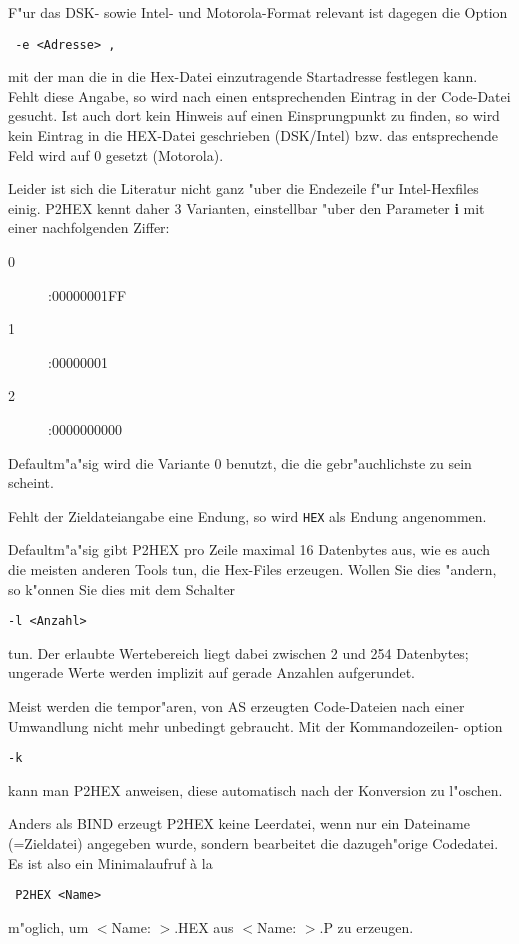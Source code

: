 \documentclass[12pt,a4paper,twoside]{report}
\newcommand{\bb}[1]{{\bf #1}}
\newcommand{\tty}[1]{{\tt #1}}
\begin{document}
F"ur das DSK- sowie Intel- und Motorola-Format relevant ist dagegen
die Option
\begin{verbatim}
 -e <Adresse> ,
\end{verbatim}
mit der man die in die Hex-Datei einzutragende Startadresse festlegen
kann.  Fehlt diese Angabe, so wird nach einen entsprechenden Eintrag
in der Code-Datei gesucht.  Ist auch dort kein Hinweis auf einen
Einsprungpunkt zu finden, so wird kein Eintrag in die HEX-Datei
geschrieben (DSK/Intel) bzw. das entsprechende Feld wird auf 0 gesetzt
(Motorola).
\par
Leider ist sich die Literatur nicht ganz "uber die Endezeile f"ur
Intel-Hexfiles einig.  P2HEX kennt daher 3 Varianten, einstellbar "uber
den Parameter \bb{i} mit einer nachfolgenden Ziffer:
\begin{description}
\item[0]{ :00000001FF}
\item[1]{ :00000001}
\item[2]{ :0000000000}
\end{description}
\par
Defaultm"a"sig wird die Variante 0 benutzt, die die gebr"auchlichste zu
sein scheint.
\par
Fehlt der Zieldateiangabe eine Endung, so wird \tty{HEX} als Endung angenommen.
\par
Defaultm"a"sig gibt P2HEX pro Zeile maximal 16 Datenbytes aus, wie es
auch die meisten anderen Tools tun, die Hex-Files erzeugen.  Wollen
Sie dies "andern, so k"onnen Sie dies mit dem Schalter
\begin{verbatim}
-l <Anzahl>
\end{verbatim}
tun.  Der erlaubte Wertebereich liegt dabei zwischen 2 und 254 Datenbytes;
ungerade Werte werden implizit auf gerade Anzahlen aufgerundet.
\par
Meist werden die tempor"aren, von AS erzeugten Code-Dateien nach einer
Umwandlung nicht mehr unbedingt gebraucht.  Mit der Kommandozeilen-
option
\begin{verbatim}
-k
\end{verbatim}
kann man P2HEX anweisen, diese automatisch nach der Konversion zu l"oschen.
\par
Anders als BIND erzeugt P2HEX keine Leerdatei, wenn nur ein Dateiname
(=Zieldatei) angegeben wurde, sondern bearbeitet die dazugeh"orige
Codedatei.  Es ist also ein Minimalaufruf \`a la
\begin{verbatim}
 P2HEX <Name>
\end{verbatim}
m"oglich, um $<$Name:  $>$.HEX aus $<$Name:  $>$.P zu erzeugen.
\end{document}
